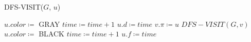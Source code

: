 \begin{algorithm}[H]
    \caption{DFS-VISIT($G$, $u$)}\label{alg:dfs-visit}
    \begin{algorithmic}[1]
        \State $u.color \coloneqq$ GRAY
        \State $time \coloneqq time + 1$
        \State $u.d \coloneqq time$
                \State $v.\pi \coloneqq u$
                \State $DFS-VISIT(G, v)$
            \EndIf
        \EndFor
        \State $u.color \coloneqq$ BLACK
        \State $time \coloneqq time + 1$
        \State $u.f \coloneqq time$
    \end{algorithmic}
\end{algorithm}
